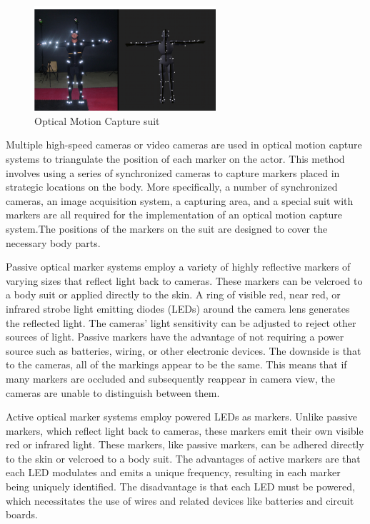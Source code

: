 
\begin{figure}[h]
	\centering
	\includegraphics[width=0.6\textwidth]{figures/Optical.png}
	\caption{Optical Motion Capture suit}
\end{figure}

Multiple high-speed cameras   \cite{Optical Motion Capture: Theory and Implementation,MOTION CAPTURE TO BUILD A FOUNDATION FOR A COMPUTER-CONTROLLED INSTRUMENT BY STUDY OF CLASSICAL GUITAR PERFORMANCE} or video cameras are used in optical motion capture systems to triangulate the position of each marker on the actor. This method involves using a series of synchronized cameras to capture markers placed in strategic locations on the body. More specifically, a number of synchronized cameras, an image acquisition system, a capturing area, and a special suit with markers are all required for the implementation of an optical motion capture system.The positions of the markers on the suit are designed to cover the necessary body parts.

Passive optical marker systems employ a variety of highly reflective markers of varying sizes that reflect light back to cameras. These markers can be velcroed to a body suit or applied directly to the skin. A ring of visible red, near red, or infrared strobe light emitting diodes (LEDs) around the camera lens generates the reflected light. The cameras' light sensitivity can be adjusted to reject other sources of light. Passive markers have the advantage of not requiring a power source such as batteries, wiring, or other electronic devices. The downside is that to the cameras, all of the markings appear to be the same. This means that if many markers are occluded and subsequently reappear in camera view, the cameras are unable to distinguish between them.

Active optical marker systems employ powered LEDs as markers.
Unlike passive markers, which reflect light back to cameras, these markers emit their own visible red or infrared light. These markers, like passive markers, can be adhered directly to the skin or velcroed to a body suit. The advantages of active markers are that each LED modulates and emits a unique frequency, resulting in each marker being uniquely identified. The disadvantage is that each LED must be powered, which necessitates the use of wires and related devices like batteries and circuit boards.
